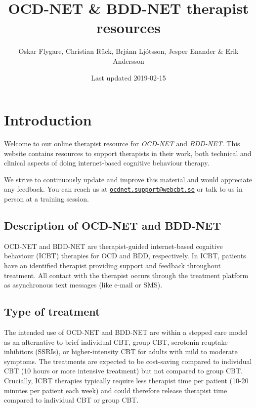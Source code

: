 \documentclass[]{book}
\title{OCD-NET \& BDD-NET therapist resources}
\author{Oskar Flygare, Christian Rück, Brjánn Ljótsson, Jesper Enander \& Erik
Andersson}
\date{Last updated 2019-02-15}
\theoremstyle{definition}
\theoremstyle{definition}
\theoremstyle{definition}
\theoremstyle{remark}
\begin{document}
\maketitle

{
\setcounter{tocdepth}{1}
\tableofcontents
}
\hypertarget{introduction}{%
\chapter{Introduction}\label{introduction}}

Welcome to our online therapist resource for \emph{OCD-NET} and
\emph{BDD-NET}. This website contains resources to support therapists in
their work, both technical and clinical aspects of doing internet-based
cognitive behaviour therapy.

We strive to continuously update and improve this material and would
appreciate any feedback. You can reach us at
\href{mailto:ocdnet.support@webcbt.se}{\nolinkurl{ocdnet.support@webcbt.se}}
or talk to us in person at a training session.

\hypertarget{description-of-ocd-net-and-bdd-net}{%
\section{Description of OCD-NET and
BDD-NET}\label{description-of-ocd-net-and-bdd-net}}

OCD-NET and BDD-NET are therapist-guided internet-based cognitive
behaviour (ICBT) therapies for OCD and BDD, respectively. In ICBT,
patients have an identified therapist providing support and feedback
throughout treatment. All contact with the therapist occurs through the
treatment platform as asynchronous text messages (like e-mail or SMS).

\hypertarget{type-of-treatment}{%
\section{Type of treatment}\label{type-of-treatment}}

The intended use of OCD-NET and BDD-NET are within a stepped care model
as an alternative to brief individual CBT, group CBT, serotonin reuptake
inhibitors (SSRIs), or higher-intensity CBT for adults with mild to
moderate symptoms. The treatments are expected to be cost-saving
compared to individual CBT (10 hours or more intensive treatment) but
not compared to group CBT. Crucially, ICBT therapies typically require
less therapist time per patient (10-20 minutes per patient each week)
and could therefore release therapist time compared to individual CBT or
group CBT.
\end{document}
